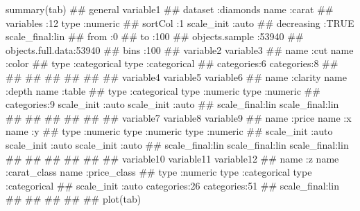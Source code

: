\begin{frame}
summary(tab)
##               general               variable1      
##  dataset          :diamonds   name       :carat    
##  variables        :12         type       :numeric  
##  sortCol          :1          scale_init :auto     
##  decreasing       :TRUE       scale_final:lin      
##  from             :0%
##  to               :100%
##  objects.sample   :53940                           
##  objects.full.data:53940                           
##  bins             :100                             
##       variable2                variable3          
##  name      :cut           name      :color        
##  type      :categorical   type      :categorical  
##  categories:6             categories:8            
##                                                   
##                                                   
##                                                   
##                                                   
##                                                   
##                                                   
##       variable4                 variable5             variable6      
##  name      :clarity       name       :depth     name       :table    
##  type      :categorical   type       :numeric   type       :numeric  
##  categories:9             scale_init :auto      scale_init :auto     
##                           scale_final:lin       scale_final:lin      
##                                                                      
##                                                                      
##                                                                      
##                                                                      
##                                                                      
##        variable7             variable8             variable9      
##  name       :price     name       :x         name       :y        
##  type       :numeric   type       :numeric   type       :numeric  
##  scale_init :auto      scale_init :auto      scale_init :auto     
##  scale_final:lin       scale_final:lin       scale_final:lin      
##                                                                   
##                                                                   
##                                                                   
##                                                                   
##                                                                   
##        variable10           variable11               variable12         
##  name       :z         name      :carat_class   name      :price_class  
##  type       :numeric   type      :categorical   type      :categorical  
##  scale_init :auto      categories:26            categories:51           
##  scale_final:lin                                                        
##                                                                         
##                                                                         
##                                                                         
##                                                                         
## 
plot(tab)


\end{frame}
